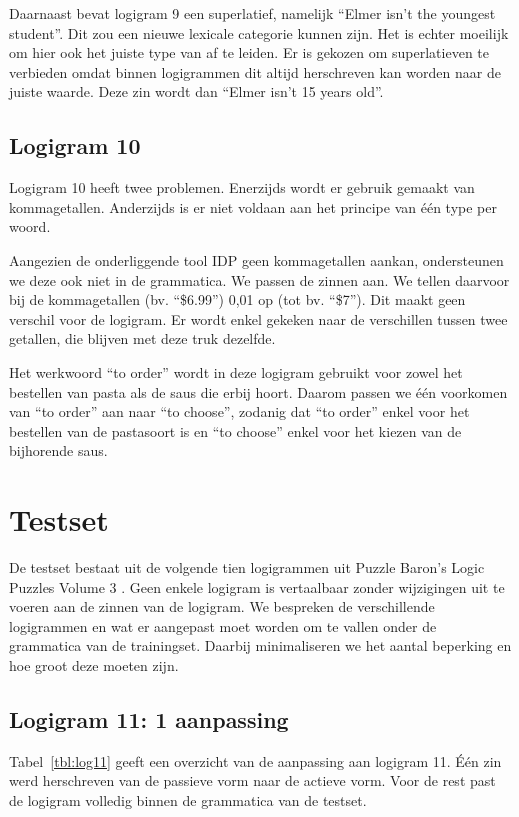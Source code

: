 Daarnaast bevat logigram 9 een superlatief, namelijk ``Elmer isn't the youngest student''. Dit zou een nieuwe lexicale categorie kunnen zijn. Het is echter moeilijk om hier ook het juiste type van af te leiden. Er is gekozen om superlatieven te verbieden omdat binnen logigrammen dit altijd herschreven kan worden naar de juiste waarde. Deze zin wordt dan ``Elmer isn't 15 years old''.

\subsection{Logigram 10}
Logigram 10 heeft twee problemen. Enerzijds wordt er gebruik gemaakt van kommagetallen. Anderzijds is er niet voldaan aan het principe van één type per woord.

Aangezien de onderliggende tool IDP geen kommagetallen aankan, ondersteunen we deze ook niet in de grammatica. We passen de zinnen aan. We tellen daarvoor bij de kommagetallen (bv. ``\$6.99'') 0,01 op (tot bv. ``\$7''). Dit maakt geen verschil voor de logigram. Er wordt enkel gekeken naar de verschillen tussen twee getallen, die blijven met deze truk dezelfde.

Het werkwoord ``to order'' wordt in deze logigram gebruikt voor zowel het bestellen van pasta als de saus die erbij hoort. Daarom passen we één voorkomen van ``to order'' aan naar ``to choose'', zodanig dat ``to order'' enkel voor het bestellen van de pastasoort is en ``to choose'' enkel voor het kiezen van de bijhorende saus.

\section{Testset}
De testset bestaat uit de volgende tien logigrammen uit Puzzle Baron's Logic Puzzles Volume 3 \cite{logigrammen}. Geen enkele logigram is vertaalbaar zonder wijzigingen uit te voeren aan de zinnen van de logigram. We bespreken de verschillende logigrammen en wat er aangepast moet worden om te vallen onder de grammatica van de trainingset. Daarbij minimaliseren we het aantal beperking en hoe groot deze moeten zijn. 

\subsection{Logigram 11: 1 aanpassing}
Tabel~\ref{tbl:log11} geeft een overzicht van de aanpassing aan logigram 11. Één zin werd herschreven van de passieve vorm naar de actieve vorm. Voor de rest past de logigram volledig binnen de grammatica van de testset.

